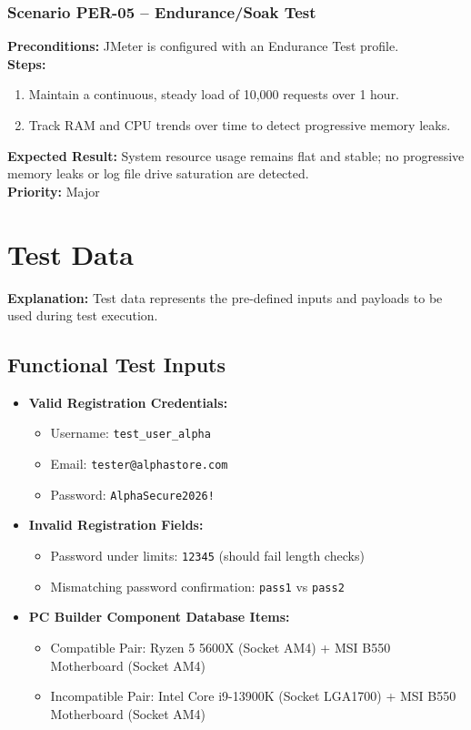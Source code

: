 \documentclass[12pt,a4paper]{article}
\begin{document}
\subsubsection*{Scenario PER-05 – Endurance/Soak Test}
\textbf{Preconditions:} JMeter is configured with an Endurance Test profile.\\
\textbf{Steps:}
\begin{enumerate}
\item Maintain a continuous, steady load of 10,000 requests over 1 hour.
\item Track RAM and CPU trends over time to detect progressive memory leaks.
\end{enumerate}
\textbf{Expected Result:} System resource usage remains flat and stable; no progressive memory leaks or log file drive saturation are detected.\\
\textbf{Priority:} Major

\newpage

\section{Test Data}

\textbf{Explanation:}
Test data represents the pre-defined inputs and payloads to be used during test execution.

\subsection{Functional Test Inputs}
\begin{itemize}
\item \textbf{Valid Registration Credentials:}
  \begin{itemize}
  \item Username: \texttt{test\_user\_alpha}
  \item Email: \texttt{tester@alphastore.com}
  \item Password: \texttt{AlphaSecure2026!}
  \end{itemize}
\item \textbf{Invalid Registration Fields:}
  \begin{itemize}
  \item Password under limits: \texttt{12345} (should fail length checks)
  \item Mismatching password confirmation: \texttt{pass1} vs \texttt{pass2}
  \end{itemize}
\item \textbf{PC Builder Component Database Items:}
  \begin{itemize}
  \item Compatible Pair: Ryzen 5 5600X (Socket AM4) + MSI B550 Motherboard (Socket AM4)
  \item Incompatible Pair: Intel Core i9-13900K (Socket LGA1700) + MSI B550 Motherboard (Socket AM4)
  \end{itemize}
\end{itemize}
\end{document}
